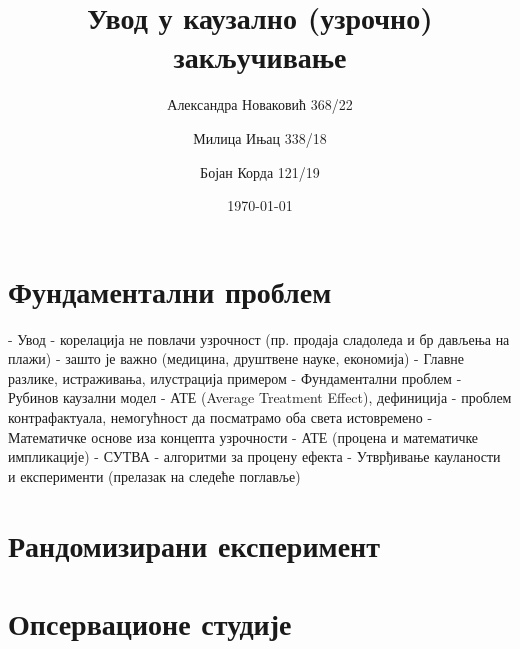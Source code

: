 \documentclass[12pt, a4paper]{article}
\title{Увод у каузално (узрочно) закључивање}
\author{Александра Новаковић 368/22}
\author{Милица Ињац 338/18}
\author{Бојан Корда 121/19}
\affil{Математички факултет, Универзитет у Београду}
\date{\today}
\begin{document}
\maketitle
\newpage

\tableofcontents
\newpage

\section{Фундаментални проблем}

- Увод
    - корелација не повлачи узрочност (пр. продаја сладоледа и бр дављења на плажи)
    - зашто је важно (медицина, друштвене науке, економија)
    - Главне разлике, истраживања, илустрација примером 
- Фундаментални проблем 
    - Рубинов каузални модел
    - АТЕ (Average Treatment Effect), дефиниција
    - проблем контрафактуала, немогућност да посматрамо оба света истовремено
- Математичке основе иза концепта узрочности
    - АТЕ (процена и математичке импликације)
    - СУТВА
    - алгоритми за процену ефекта
- Утврђивање кауланости и експерименти (прелазак на следеће поглавље) 

\newpage



\section{Рандомизирани експеримент}
\newpage



\section{Опсервационе студије}
\end{document}
